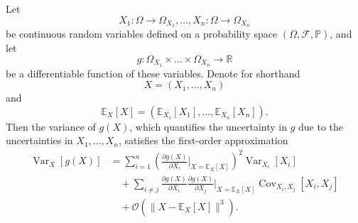 \begin{theorem}
	\label{theorem:error_propagation}
	Let
	\begin{equation}
		X_1:\Omega \to \Omega_{X_1}, \dots, X_n:\Omega \to \Omega_{X_n}
	\end{equation}
	be continuous random variables defined on a probability space $(\Omega, \mathcal{F}, \mathbb{P})$, and let
	\begin{equation}
		g:\Omega_{X_1} \times \dots \times \Omega_{X_n} \to \mathbb{R}
	\end{equation}
	be a differentiable function of these variables. Denote for shorthand
	\begin{equation}
		X = (X_1, \dots, X_n)
	\end{equation}
	and
	\begin{equation}
		\mathbb{E}_X[X] = (\mathbb{E}_{X_1}[X_1], \dots, \mathbb{E}_{X_n}[X_n]).
	\end{equation}
	Then the variance of $g(X)$, which quantifies the uncertainty in $g$ due to the uncertainties in $X_1, \dots, X_n$, satisfies the first-order approximation
	\begin{equation}
		\begin{split}
			\operatorname{Var}_X[g(X)] &= \sum_{i=1}^n \left(\frac{\partial g(X)}{\partial X_i}\bigg|_{X = \mathbb{E}_X[X]}\right)^{\!2} \operatorname{Var}_{X_i}[X_i]
			\\&\quad+ \sum_{i \neq j} \frac{\partial g(X)}{\partial X_i}\frac{\partial g(X)}{\partial X_j}\bigg|_{X = \mathbb{E}_X[X]} \operatorname{Cov}_{X_i,X_j}[X_i, X_j]\\
			&\quad+ \mathcal{O}(\|X - \mathbb{E}_X[X]\|^3).
		\end{split}
		\label{eq:var_approx}
	\end{equation}
\end{theorem}

